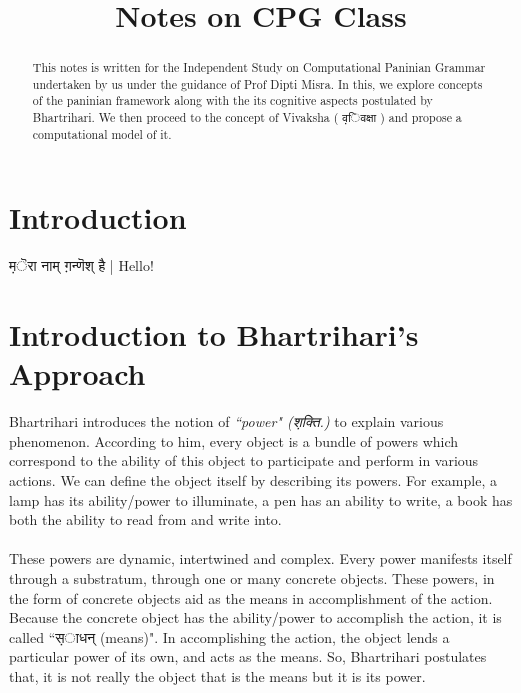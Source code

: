 \documentclass[a4paper,10pt]{article}
\title{Notes on CPG Class}
\author{}
\begin{document}
\maketitle

\newpage

\tableofcontents

\newpage

\begin{abstract}

  This notes is written for the Independent Study on Computational Paninian Grammar undertaken by us under the guidance of Prof Dipti Misra.
  In this, we explore concepts of the paninian framework along with the its cognitive aspects postulated by Bhartrihari.
  We then proceed to the concept of Vivaksha ( {\d विवक्षा }) and propose a computational model of it.

\end{abstract}
\newpage
\section{Introduction}
{\d मॆरा नाम् ग़न्णॆश् है |} Hello!


\newpage
\section{Introduction to Bhartrihari's Approach}

Bhartrihari introduces the notion of \textit{``power" ({\d शक्ति.})} to explain various phenomenon. 
According to him, every object is a bundle of powers which correspond to the ability of this object to participate and perform in various actions. 
We can define the object itself by describing its powers. For example, a lamp has its ability/power to illuminate, a pen has an ability to write,
a book has both the ability to read from and write into.

\paragraph{} These powers are dynamic, intertwined and complex. Every power manifests itself through a substratum, through one or many concrete objects. 
These powers, in the form of concrete objects aid as the means in accomplishment of the action. Because the concrete object has the ability/power 
to accomplish the action, it is called ``{\d साधन्} (means)".
In accomplishing the action, the object lends a particular power of its own, and acts as the means. So, Bhartrihari postulates that, it is not really the object that is the means but it is its power.
\end{document}
